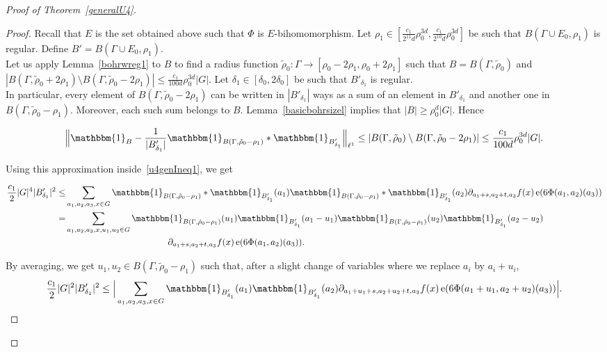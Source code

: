 \documentclass[a4paper,11pt]{article}
\numberwithin{theorem}{section}
\theoremstyle{definition}
\newcommand\id{\mathbbm{1}}
\newcommand{\on}[1]{
	\operatorname{#1}
}
\begin{document}
\begin{proof}[Proof of Theorem~\ref{generalU4}]
    \begin{proof}
        Recall that $E$ is the set obtained above such that $\Phi$ is $E$-bihomomorphism. Let $\rho_1 \in [\frac{c_1}{2^{11}d}\rho_0^{3d}, \frac{c_1}{2^{10}d}\rho_0^{3d}]$ be such that $B(\Gamma \cup E_0, \rho_1)$ is regular. Define $B' = B(\Gamma \cup E_0, \rho_1)$.\\
        \indent Let us apply Lemma~\ref{bohrwreg1} to $B$ to find a radius function $\tilde{\rho}_0 : \Gamma \to [\rho_0 - 2\rho_1, \rho_0 + 2\rho_1]$ such that $B = B(\Gamma, \tilde{\rho}_0)$ and $|B(\Gamma, \tilde{\rho}_0 + 2\rho_1) \setminus B(\Gamma, \tilde{\rho}_0 - 2\rho_1)| \leq \frac{c_1}{100 d}\rho_0^{3d} |G|$. Let $\delta_1 \in [\delta_0, 2\delta_0]$ be such that $B'_{\delta_1}$ is regular.\\
        
        In particular, every element of $B(\Gamma, \tilde{\rho}_0 - 2\rho_1)$ can be written in $|B'_{\delta_1}|$ ways as a sum of an element in $B'_{\delta_1}$ and another one in $B(\Gamma, \tilde{\rho}_0 - \rho_1)$. Moreover, each such sum belongs to $B$. Lemma~\ref{basicbohrsizel} implies that $|B| \geq \rho_0^d|G|$. Hence
        
        \[\Big\|\id_B - \frac{1}{|B'_{\delta_1}|} \id_{B(\Gamma, \tilde{\rho}_0 - \rho_1)} \ast \id_{B'_{\delta_1}}\Big\|_{\ell^1} \leq |B(\Gamma, \tilde{\rho}_0) \setminus B(\Gamma, \tilde{\rho}_0 - 2\rho_1)| \leq \frac{c_1}{100 d}\rho_0^{3d} |G|.\]
    
        Using this approximation inside~\eqref{u4genIneq1}, we get
    
        \begin{align*}\frac{c_1}{2} |G|^4 |B'_{\delta_1}|^2 \leq & \sum_{a_1, a_2, a_3, x\in G} \id_{B(\Gamma, \tilde{\rho}_0 - \rho_1)} \ast \id_{B'_{\delta_1}}(a_1)\id_{B(\Gamma, \tilde{\rho}_0 - \rho_1)} \ast \id_{B'_{\delta_1}}(a_2) \partial_{a_1 + s, a_2 + t, a_3} f(x) \on{e}(6\Phi(a_1, a_2)(a_3))\\
        = & \sum_{a_1, a_2, a_3, x, u_1, u_2\in G} \id_{B(\Gamma, \tilde{\rho}_0 - \rho_1)}(u_1) \id_{B'_{\delta_1}}(a_1 - u_1)\id_{B(\Gamma, \tilde{\rho}_0 - \rho_1)}(u_2) \id_{B'_{\delta_1}}(a_2 - u_2) \\
        &\hspace{4cm}\partial_{a_1 + s, a_2 + t, a_3} f(x) \on{e}(6\Phi(a_1, a_2)(a_3)).\end{align*}
    
        By averaging, we get $u_1, u_2 \in B(\Gamma, \tilde{\rho}_0 - \rho_1)$ such that, after a slight change of variables where we replace $a_i$ by $a_i + u_i$,
        \[\frac{c_1}{2} |G|^2 |B'_{\delta_1}|^2 \leq \Big|\sum_{a_1, a_2, a_3, x\in G} \id_{B'_{\delta_1}}(a_1) \id_{B'_{\delta_1}}(a_2) \partial_{a_1 +u_1+ s, a_2 +u_2+ t, a_3} f(x) \on{e}(6\Phi(a_1 + u_1, a_2 + u_2)(a_3))\Big|.\]


\end{proof}
\end{proof}
\end{document}
